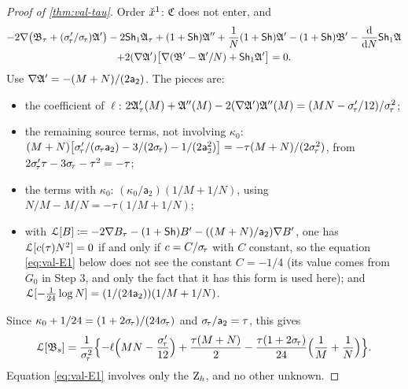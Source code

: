\begin{proof}[Proof of \cref{thm:val-tau}]
Order $\check{x}^1$: $\mathfrak{C}$ does not enter, and
\begin{multline*}
-2\nabla\bigl(\mathfrak{B}_\tau+(\sigma_{\!\tau}'/\sigma_{\!\tau})\mathfrak{A}'\bigr)-2\mathsf{Sh}_1\mathfrak{A}_\tau+(1+\mathsf{Sh})\mathfrak{A}''+\frac{1}{N}(1+\mathsf{Sh})\mathfrak{A}'-(1+\mathsf{Sh})\mathfrak{B}'-\frac{\mathrm{d}}{\mathrm{d} N}\mathsf{Sh}_1\mathfrak{A}\\
+2(\nabla\mathfrak{A}')\bigl[\nabla(\mathfrak{B}'-\mathfrak{A}'/N)+\mathsf{Sh}_1\mathfrak{A}'\bigr]=0.
\end{multline*}
Use $\nabla\mathfrak{A}'=-(M+N)/(2\mathsf{a}_2)$. The pieces are:
\begin{itemize}
\item the coefficient of $\ell$: $2\mathfrak{A}_\tau'(M)+\mathfrak{A}''(M)-2(\nabla\mathfrak{A}')\mathfrak{A}''(M)=(MN-\sigma_{\!\tau}'/12)/\sigma_{\!\tau}^2$;
\item the remaining source terms, not involving $\kappa_0$: $(M+N)\bigl[\sigma_{\!\tau}'/(\sigma_{\!\tau}\mathsf{a}_2)-3/(2\sigma_{\!\tau})-1/(2\mathsf{a}_2^2)\bigr]=-\tau(M+N)/(2\sigma_{\!\tau}^2)$, from $2\sigma_{\!\tau}'\tau-3\sigma_{\!\tau}-\tau^2=-\tau$;
\item the terms with $\kappa_0$: $(\kappa_0/\mathsf{a}_2)(1/M+1/N)$, using $N/M-M/N=-\tau(1/M+1/N)$;
\item with $\mathcal{L}[B]\coloneqq-2\nabla B_\tau-(1+\mathsf{Sh})B'-((M+N)/\mathsf{a}_2)\nabla B'$, one has $\mathcal{L}[c(\tau)N^2]=0$ if and only if $c=C/\sigma_{\!\tau}$ with $C$ constant, so the equation \eqref{eq:val-E1} below does not see the constant $C=-1/4$ (its value comes from $G_0$ in Step 3, and only the fact that it has this form is used here); and $\mathcal{L}[-\tfrac{1}{24}\log N]=(1/(24\mathsf{a}_2))(1/M+1/N)$.
\end{itemize}
Since $\kappa_0+1/24=(1+2\sigma_{\!\tau})/(24\sigma_{\!\tau})$ and $\sigma_{\!\tau}/\mathsf{a}_2=\tau$, this gives
\begin{equation}\label{eq:val-E1}
\mathcal{L}[\mathfrak{B}_s]=\frac{1}{\sigma_{\!\tau}^2}\Bigl\{-\ell\Bigl(MN-\frac{\sigma_{\!\tau}'}{12}\Bigr)+\frac{\tau(M+N)}{2}-\frac{\tau(1+2\sigma_{\!\tau})}{24}\Bigl(\frac1M+\frac1N\Bigr)\Bigr\}.
\end{equation}
Equation \eqref{eq:val-E1} involves only the $\mathrm{Z}_h$, and no other unknown.


\end{proof}
